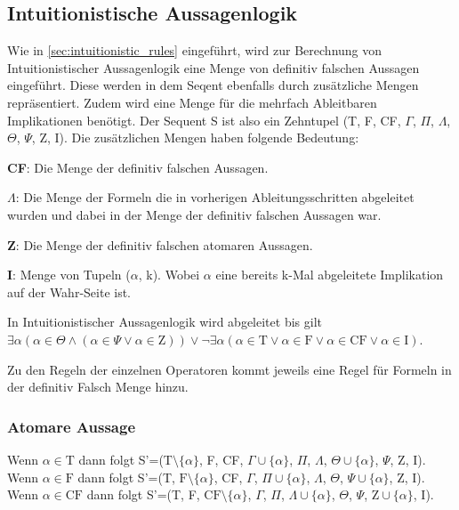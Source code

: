 \subsection{Intuitionistische Aussagenlogik}
Wie in \autoref{sec:intuitionistic_rules} eingeführt, wird zur Berechnung von Intuitionistischer Aussagenlogik eine Menge von definitiv falschen Aussagen eingeführt. Diese werden in dem Seqent ebenfalls durch zusätzliche Mengen repräsentiert. Zudem wird eine Menge für die mehrfach Ableitbaren Implikationen benötigt. Der Sequent S ist also ein Zehntupel (T, F, CF, $\Gamma$, $\Pi$, $\Lambda$, $\Theta$, $\Psi$, Z, I). Die zusätzlichen Mengen haben folgende Bedeutung:

\begin{description}
\item \textbf{CF}: Die Menge der definitiv falschen Aussagen.

\item \textbf{$\Lambda$}: Die Menge der Formeln die in vorherigen Ableitungsschritten abgeleitet wurden und dabei in der Menge der definitiv falschen Aussagen war.

\item \textbf{Z}: Die Menge der definitiv falschen atomaren Aussagen.

\item \textbf{I}: Menge von Tupeln ($\alpha$, k). Wobei $\alpha$ eine bereits k-Mal abgeleitete Implikation auf der Wahr-Seite ist.
\end{description}

In Intuitionistischer Aussagenlogik wird abgeleitet bis gilt $\exists\alpha(\alpha\in\Theta\wedge(\alpha\in\Psi\vee\alpha\in\textrm{Z}))\vee\neg\exists\alpha(\alpha\in\textrm{T}\vee\alpha\in\textrm{F}\vee\alpha\in\textrm{CF}\vee\alpha\in\textrm{I})$.

Zu den Regeln der einzelnen Operatoren kommt jeweils eine Regel für Formeln in der definitiv Falsch Menge hinzu.

\subsubsection{Atomare Aussage}
Wenn $\alpha\in\textrm{T}$ dann folgt S'=($\textrm{T}\setminus\lbrace\alpha\rbrace$, F, CF, $\Gamma\cup\lbrace\alpha\rbrace$, $\Pi$, $\Lambda$, $\Theta\cup\lbrace\alpha\rbrace$, $\Psi$, Z, I).\\
Wenn $\alpha\in\textrm{F}$ dann folgt S'=(T, $\textrm{F}\setminus\lbrace\alpha\rbrace$, CF, $\Gamma$, $\Pi\cup\lbrace\alpha\rbrace$, $\Lambda$, $\Theta$, $\Psi\cup\lbrace\alpha\rbrace$, Z, I).\\
Wenn $\alpha\in\textrm{CF}$ dann folgt S'=(T, F, $\textrm{CF}\setminus\lbrace\alpha\rbrace$, $\Gamma$, $\Pi$, $\Lambda\cup\lbrace\alpha\rbrace$, $\Theta$, $\Psi$, $\textrm{Z}\cup\lbrace\alpha\rbrace$, I).

